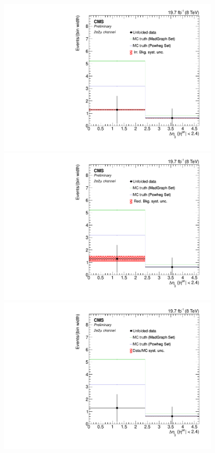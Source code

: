 \begin{figure}[hbtp]
\begin{center}
   \includegraphics[width=0.8\cmsFigWidth]{Figures/Unfolding/Systematics/ZZTo2e2m_CentralDeta_IrrBkg_Mad_fr}
   \includegraphics[width=0.8\cmsFigWidth]{Figures/Unfolding/Systematics/ZZTo2e2m_CentralDeta_RedBkg_Mad_fr}     
   \includegraphics[width=0.8\cmsFigWidth]{Figures/Unfolding/Systematics/ZZTo2e2m_CentralDeta_UnfDataOverGenMC_Mad_fr}     

\end{center}
\end{figure}
